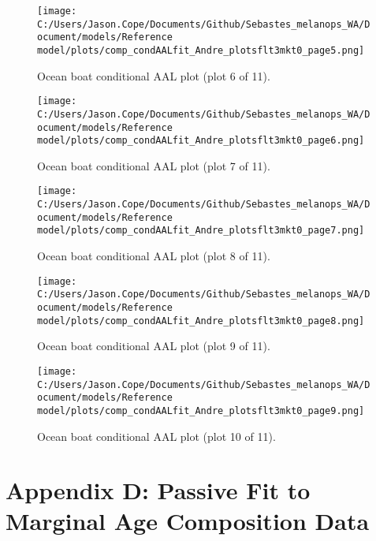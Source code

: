 \documentclass[11pt,
  english,
  letterpaper,
]{article}
\begin{document}
\begin{figure}
\centering
\texttt{[image: C:/Users/Jason.Cope/Documents/Github/Sebastes\_melanops\_WA/Document/models/Reference model/plots/comp\_condAALfit\_Andre\_plotsflt3mkt0\_page5.png]}
\caption{Ocean boat conditional AAL plot (plot 6 of 11).\label{fig:comp_condAALfit_Andre_plotsflt3mkt0_page5}}
\end{figure}

\begin{figure}
\centering
\texttt{[image: C:/Users/Jason.Cope/Documents/Github/Sebastes\_melanops\_WA/Document/models/Reference model/plots/comp\_condAALfit\_Andre\_plotsflt3mkt0\_page6.png]}
\caption{Ocean boat conditional AAL plot (plot 7 of 11).\label{fig:comp_condAALfit_Andre_plotsflt3mkt0_page6}}
\end{figure}

\begin{figure}
\centering
\texttt{[image: C:/Users/Jason.Cope/Documents/Github/Sebastes\_melanops\_WA/Document/models/Reference model/plots/comp\_condAALfit\_Andre\_plotsflt3mkt0\_page7.png]}
\caption{Ocean boat conditional AAL plot (plot 8 of 11).\label{fig:comp_condAALfit_Andre_plotsflt3mkt0_page7}}
\end{figure}

\begin{figure}
\centering
\texttt{[image: C:/Users/Jason.Cope/Documents/Github/Sebastes\_melanops\_WA/Document/models/Reference model/plots/comp\_condAALfit\_Andre\_plotsflt3mkt0\_page8.png]}
\caption{Ocean boat conditional AAL plot (plot 9 of 11).\label{fig:comp_condAALfit_Andre_plotsflt3mkt0_page8}}
\end{figure}

\begin{figure}
\centering
\texttt{[image: C:/Users/Jason.Cope/Documents/Github/Sebastes\_melanops\_WA/Document/models/Reference model/plots/comp\_condAALfit\_Andre\_plotsflt3mkt0\_page9.png]}
\caption{Ocean boat conditional AAL plot (plot 10 of 11).\label{fig:comp_condAALfit_Andre_plotsflt3mkt0_page9}}
\end{figure}

\clearpage

\hypertarget{app-d}{%
\section{Appendix D: Passive Fit to Marginal Age Composition Data}\label{app-d}}
\end{document}
